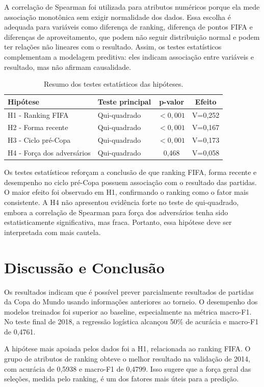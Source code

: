 \documentclass[12pt,a4paper]{article}
\begin{document}
A correlação de Spearman foi utilizada para atributos numéricos porque ela mede
associação monotônica sem exigir normalidade dos dados. Essa escolha é adequada
para variáveis como diferença de ranking, diferença de pontos FIFA e diferenças
de aproveitamento, que podem não seguir distribuição normal e podem ter relações
não lineares com o resultado. Assim, os testes estatísticos complementam a
modelagem preditiva: eles indicam associação entre variáveis e resultado, mas
não afirmam causalidade.

\begin{table}[H]
\centering
\caption{Resumo dos testes estatísticos das hipóteses.}
\label{tab:testes_hipoteses}
\begin{tabular}{l l c c}
\toprule
Hipótese & Teste principal & p-valor & Efeito \\
\midrule
H1 - Ranking FIFA & Qui-quadrado & $<0{,}001$ & V=0,252 \\
H2 - Forma recente & Qui-quadrado & $<0{,}001$ & V=0,167 \\
H3 - Ciclo pré-Copa & Qui-quadrado & $<0{,}001$ & V=0,173 \\
H4 - Força dos adversários & Qui-quadrado & 0,468 & V=0,058 \\
\bottomrule
\end{tabular}
\end{table}

Os testes estatísticos reforçam a conclusão de que ranking FIFA, forma recente
e desempenho no ciclo pré-Copa possuem associação com o resultado das partidas.
O maior efeito foi observado em H1, confirmando o ranking como o fator mais
consistente. A H4 não apresentou evidência forte no teste de qui-quadrado,
embora a correlação de Spearman para força dos adversários tenha sido
estatisticamente significativa, mas fraca. Portanto, essa hipótese deve ser
interpretada com mais cautela.

\section{Discussão e Conclusão}

Os resultados indicam que é possível prever parcialmente resultados de partidas
da Copa do Mundo usando informações anteriores ao torneio. O desempenho dos
modelos treinados foi superior ao baseline, especialmente na métrica macro-F1.
No teste final de 2018, a regressão logística alcançou 50\% de acurácia e
macro-F1 de 0,4761.

A hipótese mais apoiada pelos dados foi a H1, relacionada ao ranking FIFA. O
grupo de atributos de ranking obteve o melhor resultado na validação de 2014,
com acurácia de 0,5938 e macro-F1 de 0,4799. Isso sugere que a força geral das
seleções, medida pelo ranking, é um dos fatores mais úteis para a predição.
\end{document}
